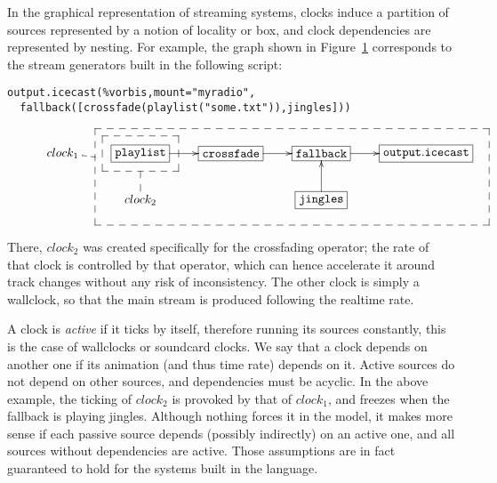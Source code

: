 In the graphical representation of streaming systems,
clocks induce a partition of sources represented by a notion of locality
or box, and clock dependencies are represented by nesting.
For example, the graph shown in Figure~\ref{fig:boxes}
corresponds to the stream generators built in the following
script:
\begin{verbatim}
output.icecast(%vorbis,mount="myradio",
  fallback([crossfade(playlist("some.txt")),jingles]))
\end{verbatim}

\begin{figure}[t]
 \begin{center}
\[
\def\f{\save
*+<15pt>[F--]\frm{}\ar @{--} "2,2"\restore}%
\def\g{\save
"2,4"."1,2"."1,5"!C*+<27pt>[F--]\frm{}\ar @{--} "1,1"\restore}%
\xymatrix{
   {clock_1} & *+[F]{\mathtt{playlist}}\ar[r]\f&*+[F]{\mathtt{crossfade}}\ar[r]&  *+[F]{\mathtt{fallback}}\ar[r]&
  *+[F]{\mathtt{output.icecast}}\\
   &{clock_2} &  & *+[F]{\mathtt{jingles}}\ar[u]\g& 
}
\]
\end{center}
 \label{fig:boxes}
\end{figure}

There, $clock_2$
was created specifically for the crossfading
operator; the rate of that clock is controlled by that operator,
which can hence accelerate it around track changes without any
risk of inconsistency.
The other clock is simply a wallclock, so that the main stream
is produced following the realtime rate.

A clock is \emph{active} if it ticks by itself,
therefore running its sources constantly, this
is the case of wallclocks or soundcard clocks.
We say that a clock depends on another one
if its animation (and thus time rate) depends on it.
Active sources do not depend on other sources,
and dependencies must be acyclic.
In the above example, the ticking of
$clock_2$ is provoked by that of
$clock_1$, and freezes when the fallback
is playing jingles.
Although nothing forces it in the model, it makes more sense if
each passive source depends (possibly indirectly) on an active one,
and all sources without dependencies are active.
Those assumptions are in fact guaranteed to hold for the systems
built in the \liquidsoap{} language.

